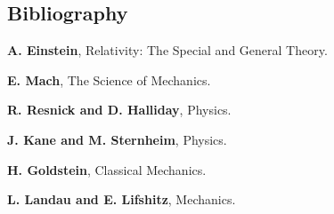 \documentclass[10pt]{article}
\begin{document}
\vspace{+1.50em}

{\centering\subsection*{Bibliography}}

\vspace{+1.20em}

\par \textbf{A. Einstein}, Relativity: The Special and General Theory.
\bigskip
\par \textbf{E. Mach}, The Science of Mechanics.
\bigskip
\par \textbf{R. Resnick and D. Halliday}, Physics.
\bigskip
\par \textbf{J. Kane and M. Sternheim}, Physics.
\bigskip
\par \textbf{H. Goldstein}, Classical Mechanics.
\bigskip
\par \textbf{L. Landau and E. Lifshitz}, Mechanics.
\end{document}
